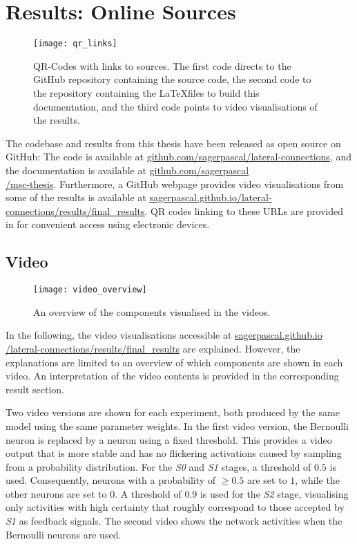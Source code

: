 \chapter{Results: Online Sources}
%
\begin{figure}[h]
    \centering
    \texttt{[image: qr\_links]}
    \caption[QR-Codes with links to sources]{QR-Codes with links to sources. The first code directs to the GitHub repository containing the source code, the second code to the repository containing the \LaTeX files to build this documentation, and the third code points to video visualisations of the results.}
\end{figure}
%
The codebase and results from this thesis have been released as open source on GitHub: The code is available at \href{https://github.com/sagerpascal/lateral-connections}{github.com/sagerpascal/lateral-connections}, and the documentation is available at \href{https://github.com/sagerpascal/msc-thesis}{github.com/sagerpascal\\/msc-thesis}.
Furthermore, a GitHub webpage provides video visualisations from some of the results is available at \href{https://sagerpascal.github.io/lateral-connections/results/final_results.html}{sagerpascal.github.io/lateral-connections/results/final\_results}.
QR codes linking to these URLs are provided in  for convenient access using electronic devices.


\section{Video}
%
\begin{figure}[h]
    \centering
    \texttt{[image: video\_overview]}
    \caption[Overview of components visualised in the videos]{An overview of the components visualised in the videos.}
\end{figure}
%
In the following, the video visualisations accessible at \href{https://sagerpascal.github.io/lateral-connections/results/final_results.html}{sagerpascal.github.io\\/lateral-connections/results/final\_results} are explained.
However, the explanations are limited to an overview of which components are shown in each video.
An interpretation of the video contents is provided in the corresponding result section.

Two video versions are shown for each experiment, both produced by the same model using the same parameter weights.
In the first video version, the Bernoulli neuron is replaced by a neuron using a fixed threshold.
This provides a video output that is more stable and has no flickering activations caused by sampling from a probability distribution.
For the \emph{S0} and \emph{S1} stages, a threshold of $0.5$ is used. Consequently, neurons with a probability of $\geq 0.5$ are set to $1$, while the other neurons are set to $0$.
A threshold of $0.9$ is used for the \emph{S2} stage, visualising only activities with high certainty that roughly correspond to those accepted by \emph{S1} as feedback signals.
The second video shows the network activities when the Bernoulli neurons are used.

